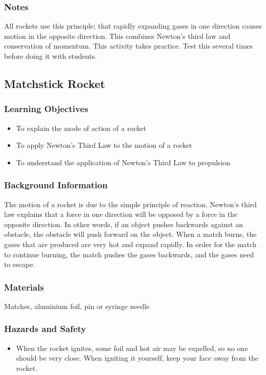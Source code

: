 \subsubsection*{Notes}
All rockets use this principle; that rapidly expanding gases in one direction causes motion in the opposite direction.  This combines Newton's third law and conservation of momentum.
This activity takes practice. Test this several times before doing it with students.  

\subsection{Matchstick Rocket}

\subsubsection*{Learning Objectives}
\begin{itemize}
\item{To explain the mode of action of a rocket} 
\item{To apply Newton's Third Law to the motion of a rocket} 
\item{To understand the application of Newton's Third Law to propulsion} 
\end{itemize}

\subsubsection*{Background Information}
The motion of a rocket is due to the simple principle of reaction.  Newton's third law explains that a force in one direction will be opposed by a force in the opposite direction.  In other words, if an object pushes backwards against an obstacle, the obstacle will push forward on the object.  When a match burns, the gases that are produced are very hot and expand rapidly. In order for the match to continue burning, the match pushes the gases backwards, and the gases need to escape.

\subsubsection*{Materials}
Matches, aluminium foil, pin or syringe needle

\subsubsection*{Hazards and Safety}
\begin{itemize}
\item{When the rocket ignites, some foil and hot air may be expelled, so no one should be very close. When igniting it yourself, keep your face away from the rocket.} 
\end{itemize}

